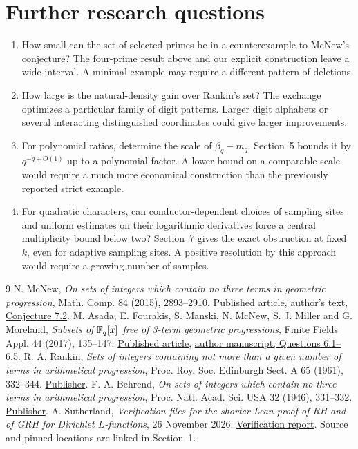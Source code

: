 \documentclass[11pt,letterpaper]{article}
\theoremstyle{definition}\newtheorem{definition}[theorem]{Definition}
\begin{document}
\section{Further research questions}
\begin{enumerate}
\item How small can the set of selected primes be in a counterexample to McNew's conjecture? The four-prime result above and our explicit construction leave a wide interval. A minimal example may require a different pattern of deletions.
\item How large is the natural-density gain over Rankin's set? The exchange optimizes a particular family of digit patterns. Larger digit alphabets or several interacting distinguished coordinates could give larger improvements.
\item For polynomial ratios, determine the scale of $\beta_q-m_q$. Section~5 bounds it by $q^{-q+O(1)}$ up to a polynomial factor. A lower bound on a comparable scale would require a much more economical construction than the previously reported strict example.
\item For quadratic characters, can conductor-dependent choices of sampling sites and uniform estimates on their logarithmic derivatives force a central multiplicity bound below two? Section~7 gives the exact obstruction at fixed $k$, even for adaptive sampling sites. A positive resolution by this approach would require a growing number of samples.
\end{enumerate}
\begin{thebibliography}{9}
 N. McNew, \emph{On sets of integers which contain no three terms in geometric progression}, Math. Comp. 84 (2015), 2893--2910. \href{https://doi.org/10.1090/mcom/2979}{Published article}, \href{https://www.nathanmcnew.com/GPFsets.pdf}{author's text, Conjecture 7.2}.
 M. Asada, E. Fourakis, S. Manski, N. McNew, S. J. Miller and G. Moreland, \emph{Subsets of $\mathbb F_q[x]$ free of 3-term geometric progressions}, Finite Fields Appl. 44 (2017), 135--147. \href{https://doi.org/10.1016/j.ffa.2016.10.002}{Published article}, \href{https://www.nathanmcnew.com/fqxramsey.pdf}{author manuscript, Questions 6.1--6.5}.
 R. A. Rankin, \emph{Sets of integers containing not more than a given number of terms in arithmetical progression}, Proc. Roy. Soc. Edinburgh Sect. A 65 (1961), 332--344. \href{https://doi.org/10.1017/S0080454100017726}{Publisher}.
 F. A. Behrend, \emph{On sets of integers which contain no three terms in arithmetical progression}, Proc. Natl. Acad. Sci. USA 32 (1946), 331--332. \href{https://doi.org/10.1073/pnas.32.12.331}{Publisher}.
 A. Sutherland, \emph{Verification files for the shorter Lean proof of RH and of GRH for Dirichlet $L$-functions}, 26 November 2026. \href{https://math.mit.edu/~drew/shortgrh/}{Verification report}. Source and pinned locations are linked in Section~1.
\end{thebibliography}
\end{document}
